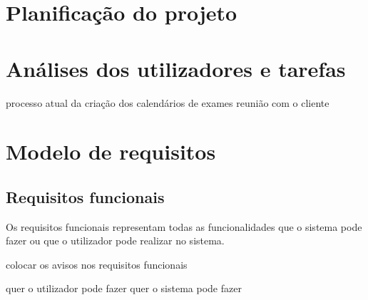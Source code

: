 \documentclass[11pt, twoside]{report}
\begin{document}
	\chapter{Planificação do projeto}

 	

	\chapter{Análises dos utilizadores e tarefas}
	processo atual da criação dos calendários de exames
	reunião com o cliente
	
	\chapter{Modelo de requisitos}
	\section{Requisitos funcionais}
	
	

	\pagebreak %
	Os requisitos funcionais representam todas as funcionalidades que o sistema pode fazer ou que o utilizador pode realizar no sistema. 
	
	colocar os avisos nos requisitos funcionais
	
	quer o utilizador pode fazer quer o sistema pode fazer
	
\end{document}
